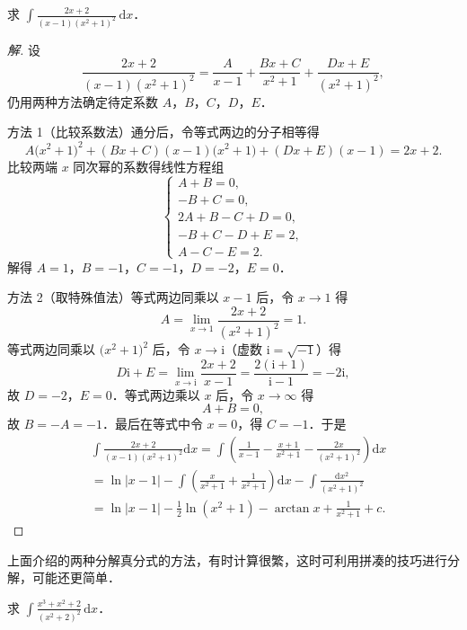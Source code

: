 \begin{example}\label{ex:6-2-22}
求 $\displaystyle\int\frac{2x+2}{(x-1)\left(x^{2}+1\right)^{2}}\,\mathrm{d}x$．
\end{example}

\begin{proof}[解]
设
\[
\frac{2x+2}{(x-1)\left(x^{2}+1\right)^{2}} = \frac{A}{x-1}+\frac{Bx+C}{x^{2}+1}+\frac{Dx+E}{\left(x^{2}+1\right)^{2}},
\]
仍用两种方法确定待定系数 $A$，$B$，$C$，$D$，$E$．

方法 1（比较系数法）\quad 通分后，令等式两边的分子相等得
\[
A\big(x^{2}+1\big)^{2}+(Bx+C)(x-1)\big(x^{2}+1\big)+(Dx+E)(x-1) = 2x+2.
\]
比较两端 $x$ 同次幂的系数得线性方程组
\[
\begin{cases}
A+B = 0,\\
-B+C = 0,\\
2A+B-C+D = 0,\\
-B+C-D+E = 2,\\
A-C-E = 2.
\end{cases}
\]
解得 $A = 1$，$B = -1$，$C = -1$，$D = -2$，$E = 0$．

方法 2（取特殊值法）\quad 等式两边同乘以 $x-1$ 后，令 $x \to 1$ 得
\[
A = \lim_{x\to1}\frac{2x+2}{\left(x^{2}+1\right)^{2}} = 1.
\]
等式两边同乘以 $\big(x^{2}+1\big)^{2}$ 后，令 $x \to \mathrm{i}$（虚数 $\mathrm{i} = \sqrt{-1}$）得
\[
D\mathrm{i}+E = \lim_{x\to\mathrm{i}}\frac{2x+2}{x-1} = \frac{2(\mathrm{i}+1)}{\mathrm{i}-1} = -2\mathrm{i},
\]
故 $D = -2$，$E = 0$．等式两边乘以 $x$ 后，令 $x \to \infty$ 得
\[
A+B = 0,
\]
故 $B = -A = -1$．最后在等式中令 $x = 0$，得 $C = -1$．于是
\[
\begin{aligned}
&\int\frac{2x+2}{(x-1)\left(x^{2}+1\right)^{2}}\mathrm{d}x
= \int\left(\frac{1}{x-1}-\frac{x+1}{x^{2}+1}-\frac{2x}{\left(x^{2}+1\right)^{2}}\right)\mathrm{d}x\\
&= \ln|x-1|-\int\left(\frac{x}{x^{2}+1}+\frac{1}{x^{2}+1}\right)\mathrm{d}x-\int\frac{\mathrm{d}x^{2}}{\left(x^{2}+1\right)^{2}}\\
&= \ln|x-1|-\frac{1}{2}\ln\left(x^{2}+1\right)-\arctan x+\frac{1}{x^{2}+1}+c.
\end{aligned}
\]
\end{proof}

上面介绍的两种分解真分式的方法，有时计算很繁，这时可利用拼凑的技巧进行分解，可能还更简单．

\begin{example}\label{ex:6-2-23}
求 $\displaystyle\int\frac{x^{3}+x^{2}+2}{\left(x^{2}+2\right)^{2}}\,\mathrm{d}x$．
\end{example}

